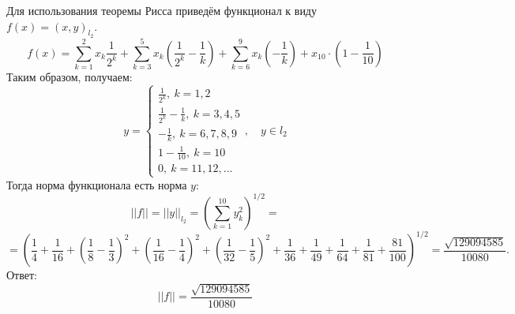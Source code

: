 \documentclass[fleqn]{article}
\begin{document}
Для использования теоремы Рисса приведём функционал к виду $f(x) = (x, y)_{l_2}$. 
\begin{equation*} 
	f(x) = \sum_{k=1}^2x_k\frac1{2^k} + \sum_{k=3}^{5}x_k\left(\frac1{2^k} -\frac1k\right) + 
	\sum_{k=6}^{9}x_k\left( -\frac1k\right) + x_{10}\cdot{}\left(1 - \frac1{10}\right)
\end{equation*}
Таким образом, получаем:
\begin{equation*} 
	 y = \begin{cases} 
				 \frac1{2^k}, \  k =1, 2 \\
				\frac1{2^k} -\frac1k , \  k = 3, 4, 5 \\
				-\frac1k, \  k = 6, 7, 8, 9 \\
				1 - \frac1{10}, \  k = 10 \\
				0, \  k = 11, 12, ...
			\end{cases},\quad y \in l_2
\end{equation*}
Тогда норма функционала есть норма  $y$:
\begin{equation*} 
	||f|| = ||y||_{l_2} = \left(\sum_{k=1}^{10} y_k^2\right)^{1/2} = 
\end{equation*}
\begin{equation*} 
	= \left( \frac14 + \frac1{16} + \left(\frac18 - \frac13\right)^2 + 
	\left(\frac1{16} - \frac14\right)^2  + \left(\frac1{32} - \frac15\right)^2
	+ \frac1{36} + \frac1{49} + \frac1{64} + \frac1{81} +  \frac{81}{100} \right)^{1/2} =
	\frac{\sqrt{129094585}}{10080}.
\end{equation*}
Ответ:
\begin{equation*} 
	||f|| =  \frac{\sqrt{129094585}}{10080}
\end{equation*}
\end{document}
